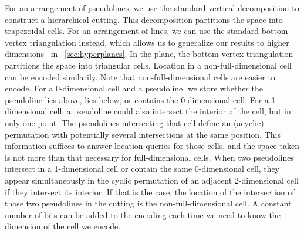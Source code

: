 %
\ifeurocg\else%
For an arrangement of pseudolines, we use the standard vertical decomposition
to construct a hierarchical cutting.
This decomposition partitions the space into trapezoidal cells.
For an arrangement of lines, we can
use the standard bottom-vertex triangulation instead, which allows us to
generalize our results to higher dimensions\ifsocg~\cite{CCILO18}\else{} in
\appref~\ref{sec:hyperplanes}\fi.
In the plane, the bottom-vertex triangulation partitions the space into
triangular cells.\fi
%
\ifeurocg%
Location in a non-full-dimensional cell can be encoded similarily.%
\else
Note that non-full-dimensional cells are easier to encode. For a 0-dimensional
cell and a pseudoline, we store whether the pseudoline lies above, lies below,
or contains the 0-dimensional cell. For a 1-dimensional cell, a pseudoline
could also intersect the interior of the cell, but in only one point. The
pseudolines intersecting that cell define an (acyclic) permutation with potentially
several intersections at the same position. This information suffices to answer
location queries for those cells, and the space taken is not more than that
necessary for full-dimensional cells. When two pseudolines intersect in a
1-dimensional cell or contain the same 0-dimensional cell, they
appear simultaneously in the cyclic permutation of an adjacent 2-dimensional
cell if they intersect its interior. If that is the case, the location of
the intersection of those two pseudolines in the cutting is the
non-full-dimensional cell. A constant number of bits can be added to the
encoding each time we need to know the dimension of the cell we encode.
\fi
